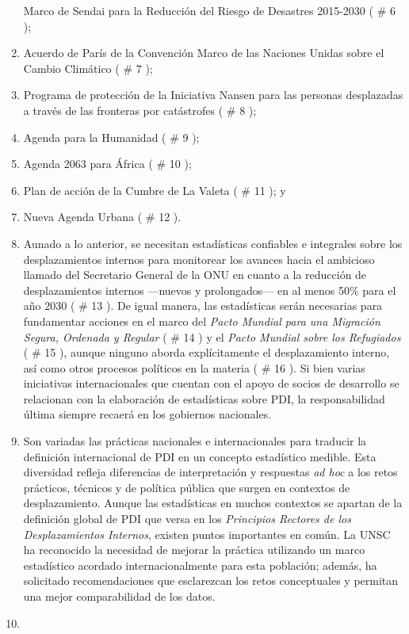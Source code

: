 \documentclass[
]{book}
\begin{document}
\begin{enumerate}
  Marco de Sendai para la Reducción del Riesgo de Desastres 2015-2030 (
  \# 6
  );
\item
  Acuerdo de París de la Convención Marco de las Naciones Unidas sobre el Cambio Climático (
  \# 7
  );
\item
  Programa de protección de la Iniciativa Nansen para las personas desplazadas a través de las fronteras por catástrofes (
  \# 8
  );
\item
  Agenda para la Humanidad (
  \# 9
  );
\item
  Agenda 2063 para África (
  \# 10
  );
\item
  Plan de acción de la Cumbre de La Valeta (
  \# 11
  ); y
\item
  Nueva Agenda Urbana (
  \# 12
  ).
\item
  Aunado a lo anterior, se necesitan estadísticas confiables e integrales sobre los desplazamientos internos para monitorear los avances hacia el ambicioso llamado del Secretario General de la ONU en cuanto a la reducción de desplazamientos internos ---nuevos y prolongados--- en al menos 50\% para el año 2030 (
  \# 13
  ). De igual manera, las estadísticas serán necesarias para fundamentar acciones en el marco del \emph{Pacto Mundial para una Migración Segura, Ordenada y Regular} (
  \# 14
  ) y el \emph{Pacto Mundial sobre los Refugiados} (
  \# 15
  ), aunque ninguno aborda explícitamente el desplazamiento interno, así como otros procesos políticos en la materia (
  \# 16
  ). Si bien varias iniciativas internacionales que cuentan con el apoyo de socios de desarrollo se relacionan con la elaboración de estadísticas sobre PDI, la responsabilidad última siempre recaerá en los gobiernos nacionales.
\item
  Son variadas las prácticas nacionales e internacionales para traducir la definición internacional de PDI en un concepto estadístico medible. Esta diversidad refleja diferencias de interpretación y respuestas \emph{ad hoc} a los retos prácticos, técnicos y de política pública que surgen en contextos de desplazamiento. Aunque las estadísticas en muchos contextos se apartan de la definición global de PDI que versa en los \emph{Principios Rectores de los Desplazamientos Internos}, existen puntos importantes en común. La UNSC ha reconocido la necesidad de mejorar la práctica utilizando un marco estadístico acordado internacionalmente para esta población; además, ha solicitado recomendaciones que esclarezcan los retos conceptuales y permitan una mejor comparabilidad de los datos.
\item ~
  \hypertarget{proceso-de-elaboraciuxf3n-de-las-recomendaciones}{%
}
\end{enumerate}
\end{document}
